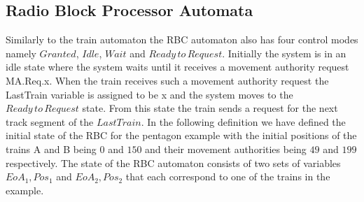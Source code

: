 \subsection{Radio Block Processor Automata}
Similarly to the train automaton the RBC automaton also has four control modes namely $Granted$, $Idle$, $Wait$ and $Ready \, to \, Request$. Initially the system is in an idle state where the system waits until it receives a movement authority request MA.Req.x. When the train receives such a movement authority request the LastTrain variable is assigned to be x and the system moves to the $Ready \, to \, Request$ state.  From this state the train sends a request for the next track segment of the $LastTrain$. In the following definition we have defined the initial state of the RBC for the pentagon example with the initial positions of the trains A and B being $0$ and $150$ and their movement authorities being $49$ and $199$ respectively. The state of the RBC automaton consists of two sets of variables $EoA_1, Pos_1$ and $EoA_2, Pos_2$ that each correspond to one of the trains in the example.
\medskip

